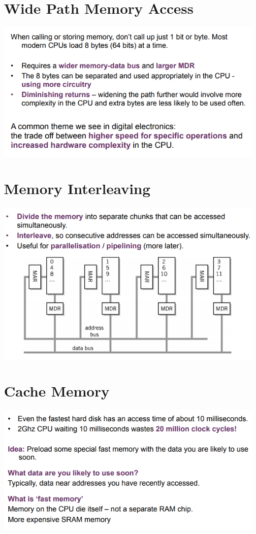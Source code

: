 \documentclass{article}[18pt]
\begin{document}
\section{Wide Path Memory Access}
\begin{center}
	\includegraphics[scale=0.7]{wide-path}
\end{center}
\section{Memory Interleaving}
\begin{center}
	\includegraphics[scale=0.7]{interleaving}
\end{center}
\section{Cache Memory}
\begin{center}
	\includegraphics[scale=0.7]{cache}
\end{center}
\end{document}

